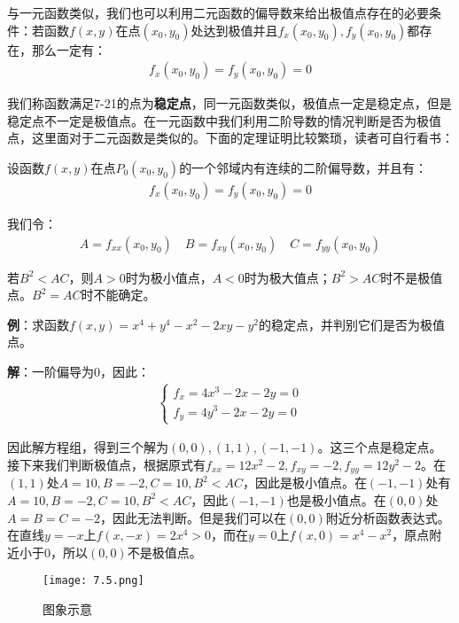 \documentclass{ctexart}
\let\oldtextbf\textbf %
\renewcommand{\textbf}[1]{\textcolor{btex}{\oldtextbf{#1}}} %
\begin{document}
与一元函数类似，我们也可以利用二元函数的偏导数来给出极值点存在的必要条件：若函数$f(x,y)$在点$(x_0,y_0)$处达到极值并且$f_x(x_0,y_0),f_y(x_0,y_0)$都存在，那么一定有：
\begin{align*}
    f_x(x_0,y_0)=f_y(x_0,y_0)=0\tag{7-21}
\end{align*}

我们称函数满足7-21的点为\textbf{稳定点}，同一元函数类似，极值点一定是稳定点，但是稳定点不一定是极值点。在一元函数中我们利用二阶导数的情况判断是否为极值点，这里面对于二元函数是类似的。下面的定理证明比较繁琐，读者可自行看书：
\begin{tcolorbox}[
    colback=bac2,     %
    colframe=fra2,   %
    coltitle=white,             %
    coltext=tex2,
    title=二元函数的极值,
    fonttitle=\bfseries,        %
arc=3mm,                     %
breakable
]
设函数$f(x,y)$在点$P_0(x_0,y_0)$的一个邻域内有连续的二阶偏导数，并且有：
\begin{align*}
    f_x(x_0,y_0)=f_y(x_0,y_0)=0
\end{align*}

我们令：
\begin{align*}
    A=f_{xx}(x_0,y_0)\quad B=f_{xy}(x_0,y_0)\quad C=f_{yy}(x_0,y_0)
\end{align*}

若$B^2<AC$，则$A>0$时为极小值点，$A<0$时为极大值点；$B^2>AC$时不是极值点。$B^2=AC$时不能确定。
\end{tcolorbox}

\textbf{例}：求函数$f(x,y)=x^4+y^4-x^2-2xy-y^2$的稳定点，并判别它们是否为极值点。

\textbf{解}：一阶偏导为0，因此：
\begin{align*}
    \begin{cases}
        f_x=4x^3-2x-2y=0\\
        f_y=4y^3-2x-2y=0
    \end{cases}
\end{align*}

因此解方程组，得到三个解为$(0,0),(1,1),(-1,-1)$。这三个点是稳定点。接下来我们判断极值点，根据原式有$f_{xx}=12x^2-2,f_{xy}=-2,f_{yy}=12y^2-2$。在$(1,1)$处$A=10,B=-2,C=10,B^2<AC$，因此是极小值点。在$(-1,-1)$处有$A=10,B=-2,C=10,B^2<AC$，因此$(-1,-1)$也是极小值点。在$(0,0)$处$A=B=C=-2$，因此无法判断。但是我们可以在$(0,0)$附近分析函数表达式。在直线$y=-x$上$f(x,-x)=2x^4>0$，而在$y=0$上$f(x,0)=x^4-x^2$，原点附近小于0，所以$(0,0)$不是极值点。

\begin{figure}[H]    
\centering     
\renewcommand{\figurename}{图}     
\renewcommand{\thefigure}{7.5}    
\begin{myimagebox}[width=0.5\textwidth] %
\texttt{[image: 7.5.png]} %
\end{myimagebox}     
\caption{\label{fig:7.5}图象示意}   
\end{figure}
\end{document}
